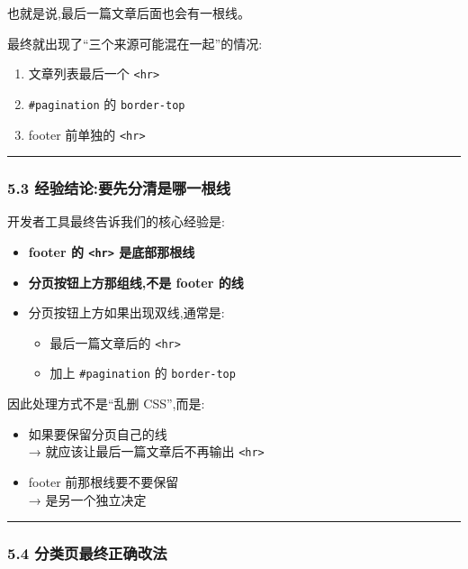 \documentclass[lang=cn,scheme=chinese,color=blue,device=normal,toc=onecol,math=cm]{elegantbook}
\begin{document}
也就是说,最后一篇文章后面也会有一根线。\par


最终就出现了“三个来源可能混在一起”的情况:\par


\begin{enumerate}
\item 文章列表最后一个 \texttt{<hr>}
\item \texttt{\#pagination} 的 \texttt{border-top}
\item footer 前单独的 \texttt{<hr>}
\end{enumerate}


\medskip\hrule\medskip


\subsubsection{5.3 经验结论:要先分清是哪一根线}


开发者工具最终告诉我们的核心经验是:\par


\begin{itemize}
\item \textbf{footer 的 \texttt{<hr>} 是底部那根线}
\item \textbf{分页按钮上方那组线,不是 footer 的线}
\item 分页按钮上方如果出现双线,通常是: 
\begin{itemize}
\item 最后一篇文章后的 \texttt{<hr>}
\item 加上 \texttt{\#pagination} 的 \texttt{border-top}
\end{itemize}
\end{itemize}


因此处理方式不是“乱删 CSS”,而是:\par


\begin{itemize}
\item 如果要保留分页自己的线\\ → 就应该让最后一篇文章后不再输出 \texttt{<hr>}
\item footer 前那根线要不要保留\\ → 是另一个独立决定
\end{itemize}


\medskip\hrule\medskip


\subsubsection{5.4 分类页最终正确改法}
\end{document}
